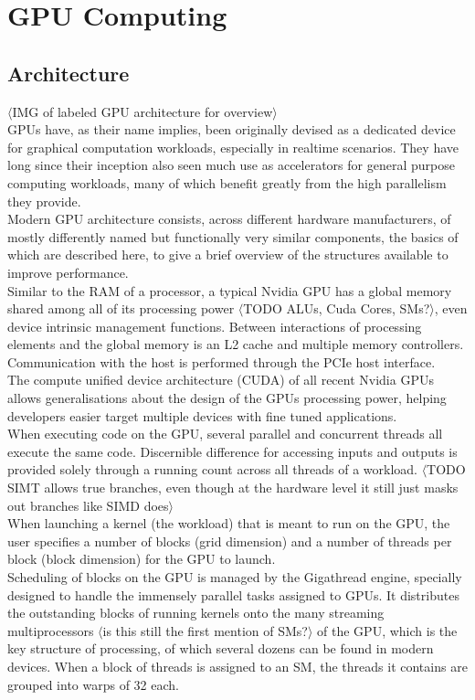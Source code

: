 \documentclass{tudscrreprt}
\newcommand{\markr}[1]{\textcolor{review}{$\langle$#1$\rangle$}}
\begin{document}
		\section{GPU Computing}
		
			\subsection{Architecture}
				\markr{IMG of labeled GPU architecture for overview}\\
				GPUs have, as their name implies, been originally devised as a dedicated device for graphical computation workloads, especially in realtime scenarios. They have long since their inception also seen much use as accelerators for general purpose computing workloads, many of which benefit greatly from the high parallelism they provide. \\
				Modern GPU architecture consists, across different hardware manufacturers, of mostly differently named but functionally very similar components, the basics of which are described here, to give a brief overview of the structures available to improve performance. \\
				
				Similar to the RAM of a processor, a typical Nvidia GPU has a global memory shared among all of its processing power \markr{TODO ALUs, Cuda Cores, SMs?}, even device intrinsic management functions. Between interactions of processing elements and the global memory is an L2 cache and multiple memory controllers. \\
				Communication with the host is performed through the PCIe host interface. \\
				
				The compute unified device architecture (CUDA) of all recent Nvidia GPUs allows generalisations about the design of the GPUs processing power, helping developers easier target multiple devices with fine tuned applications. \\
				
				When executing code on the GPU, several parallel and concurrent threads all execute the same code. Discernible difference for accessing inputs and outputs is provided solely through a running count across all threads of a workload. \markr{TODO SIMT allows true branches, even though at the hardware level it still just masks out branches like SIMD does} \\
				When launching a kernel (the workload) that is meant to run on the GPU, the user specifies a number of blocks (grid dimension) and a number of threads per block (block dimension) for the GPU to launch. \\
				Scheduling of blocks on the GPU is managed by the Gigathread engine, specially designed to handle the immensely parallel tasks assigned to GPUs. It distributes the outstanding blocks of running kernels onto the many streaming multiprocessors \markr{is this still the first mention of SMs?} of the GPU, which is the key structure of processing, of which several dozens can be found in modern devices. When a block of threads is assigned to an SM, the threads it contains are grouped into warps of 32 each. \\
				
\end{document}
